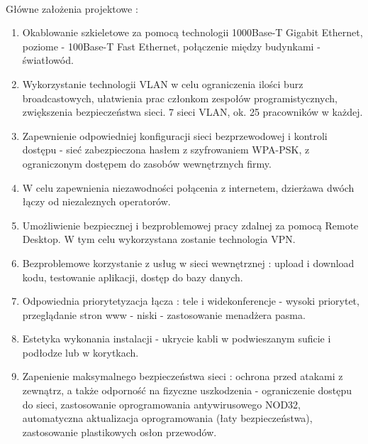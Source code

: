 \paragraph{}
Główne założenia projektowe :
\begin{enumerate}
	\item Okablowanie szkieletowe za pomocą technologii 1000Base-T Gigabit Ethernet, poziome - 100Base-T Fast Ethernet, połączenie między budynkami - światłowód.
	\item Wykorzystanie technologii VLAN w celu ograniczenia ilości burz broadcastowych, ułatwienia prac członkom zespołów programistycznych, zwiększenia bezpieczeństwa sieci. 7 sieci VLAN, ok. 25 pracowników w każdej.
	\item Zapewnienie odpowiedniej konfiguracji sieci bezprzewodowej i kontroli dostępu - sieć zabezpieczona hasłem z szyfrowaniem WPA-PSK, z ograniczonym dostępem do zasobów wewnętrznych firmy.
	\item W celu zapewnienia niezawodności połącenia z internetem, dzierżawa dwóch łączy od niezaleznych operatorów.
	\item Umożliwienie bezpiecznej i bezproblemowej pracy zdalnej za pomocą Remote Desktop. W tym celu wykorzystana zostanie technologia VPN.
	\item Bezproblemowe korzystanie z usług w sieci wewnętrznej : upload i download kodu, testowanie aplikacji, dostęp do bazy danych.
	\item Odpowiednia priorytetyzacja łącza : tele i widekonferencje - wysoki priorytet, przeglądanie stron www - niski - zastosowanie menadżera pasma.
	\item Estetyka wykonania instalacji - ukrycie kabli w podwieszanym suficie i podłodze lub w korytkach.
	\item Zapenienie maksymalnego bezpieczeństwa sieci : ochrona przed atakami z zewnątrz, a także odporność na fizyczne uszkodzenia - ograniczenie dostępu do sieci, zastosowanie oprogramowania antywirusowego NOD32, automatyczna aktualizacja oprogramowania (łaty bezpieczeństwa), zastosowanie plastikowych osłon przewodów.
\end{enumerate}
